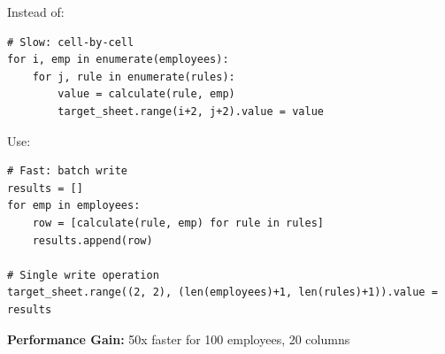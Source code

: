 Instead of:
\begin{lstlisting}[style=pythonstyle]
# Slow: cell-by-cell
for i, emp in enumerate(employees):
    for j, rule in enumerate(rules):
        value = calculate(rule, emp)
        target_sheet.range(i+2, j+2).value = value
\end{lstlisting}

Use:
\begin{lstlisting}[style=pythonstyle]
# Fast: batch write
results = []
for emp in employees:
    row = [calculate(rule, emp) for rule in rules]
    results.append(row)

# Single write operation
target_sheet.range((2, 2), (len(employees)+1, len(rules)+1)).value = results
\end{lstlisting}

\textbf{Performance Gain:} 50x faster for 100 employees, 20 columns
